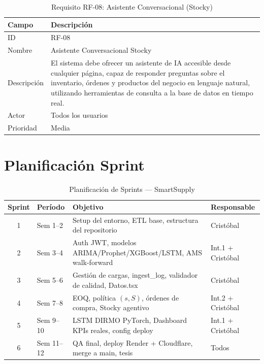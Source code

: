 \documentclass[12pt, a4paper]{report}
\begin{document}
\begin{table}[H]
  \centering
  \caption{Requisito RF-08: Asistente Conversacional (Stocky)}
  \label{tab:rf08}
  \begin{tabular}{|l|p{9cm}|}
    \hline
    \textbf{Campo} & \textbf{Descripción} \\
    \hline
    ID          & RF-08 \\
    Nombre      & Asistente Conversacional Stocky \\
    Descripción & El sistema debe ofrecer un asistente de IA accesible desde cualquier
                  página, capaz de responder preguntas sobre el inventario, órdenes y
                  productos del negocio en lenguaje natural, utilizando herramientas
                  de consulta a la base de datos en tiempo real. \\
    Actor       & Todos los usuarios \\
    Prioridad   & Media \\
    \hline
  \end{tabular}
\end{table}

\section{Planificación Sprint}

\begin{table}[H]
  \centering
  \caption{Planificación de Sprints — SmartSupply}
  \label{tab:sprints}
  \begin{tabular}{|c|l|l|p{4cm}|}
    \hline
    \textbf{Sprint} & \textbf{Período} & \textbf{Objetivo} & \textbf{Responsable} \\
    \hline
    1 & Sem 1--2  & Setup del entorno, ETL base, estructura del repositorio & Cristóbal \\
    2 & Sem 3--4  & Auth JWT, modelos ARIMA/Prophet/XGBoost/LSTM, AMS walk-forward & Int.1 + Cristóbal \\
    3 & Sem 5--6  & Gestión de cargas, ingest\_log, validador de calidad, Datos.tsx & Cristóbal \\
    4 & Sem 7--8  & EOQ, política $(s,S)$, órdenes de compra, Stocky agentivo & Int.2 + Cristóbal \\
    5 & Sem 9--10 & LSTM DIRMO PyTorch, Dashboard KPIs reales, config deploy & Int.1 + Cristóbal \\
    6 & Sem 11--12& QA final, deploy Render + Cloudflare, merge a main, tesis & Todos \\
    \hline
  \end{tabular}
\end{table}
\end{document}

